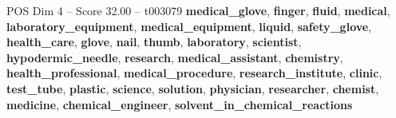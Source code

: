 \begin{textsample}{POS Dim 4 – Score 32.00 – t003079}  \label{ex:f4_pos_007}
\textbf{medical\_glove}, \textbf{finger}, \textbf{fluid}, \textbf{medical}, \textbf{laboratory\_equipment}, \textbf{medical\_equipment}, \textbf{liquid}, \textbf{safety\_glove}, \textbf{health\_care}, \textbf{glove}, \textbf{nail}, \textbf{thumb}, \textbf{laboratory}, \textbf{scientist}, \textbf{hypodermic\_needle}, \textbf{research}, \textbf{medical\_assistant}, \textbf{chemistry}, \textbf{health\_professional}, \textbf{medical\_procedure}, \textbf{research\_institute}, \textbf{clinic}, \textbf{test\_tube}, \textbf{plastic}, \textbf{science}, \textbf{solution}, \textbf{physician}, \textbf{researcher}, \textbf{chemist}, \textbf{medicine}, \textbf{chemical\_engineer}, \textbf{solvent\_in\_chemical\_reactions}

\end{textsample}
